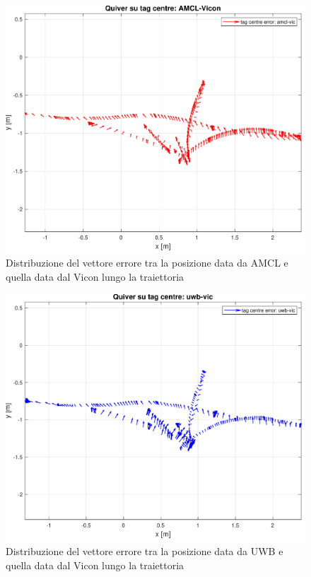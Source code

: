 \begin{figure}[] 
	\centering    
	\includegraphics[height=.3\textheight]{grafici_stanzavolo_vicon/figure21.pdf}
	\caption{Distribuzione del vettore errore tra la posizione data da AMCL e quella data dal Vicon lungo la traiettoria}
	\label{fig: quiver_err_amclvic_vicon_charlie}
\end{figure}

\begin{figure}[] 
	\centering    
	\includegraphics[height=.3\textheight]{grafici_stanzavolo_vicon/figure20.pdf}
	\caption{Distribuzione del vettore errore tra la posizione data da UWB e quella data dal Vicon lungo la traiettoria}
	\label{fig: quiver_err_uwbvic_vicon_charlie}
\end{figure}


